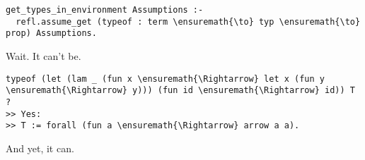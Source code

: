 \begin{verbatim}
get_types_in_environment Assumptions :-
  refl.assume_get (typeof : term \ensuremath{\to} typ \ensuremath{\to} prop) Assumptions.
\end{verbatim}

\heroSTUDENT{} Wait. It can't be.

\begin{verbatim}
typeof (let (lam _ (fun x \ensuremath{\Rightarrow} let x (fun y \ensuremath{\Rightarrow} y))) (fun id \ensuremath{\Rightarrow} id)) T ?
>> Yes:
>> T := forall (fun a \ensuremath{\Rightarrow} arrow a a).
\end{verbatim}

\heroADVISOR{} And yet, it can.
